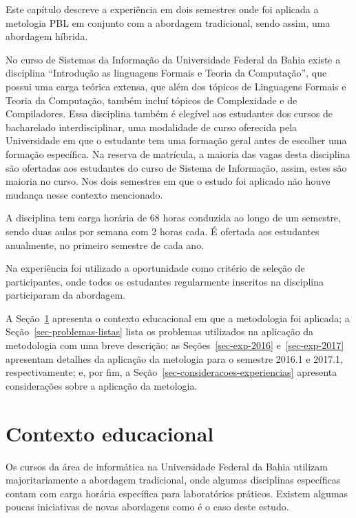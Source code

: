 
\label{cap-experiencia}
\acresetall

Este capítulo descreve a experiência em dois semestres onde foi aplicada a metologia PBL
em conjunto com a abordagem tradicional, sendo assim, uma abordagem híbrida.

No curso de Sistemas da Informação da Universidade Federal da Bahia existe
a disciplina ``Introdução as linguagens Formais e Teoria da Computação'',
que possui uma carga teórica extensa, que além dos tópicos de Linguagens Formais e Teoria
da Computação, também incluí tópicos de Complexidade e de Compiladores.
Essa disciplina também é elegível aos estudantes dos cursos de bacharelado
interdisciplinar, uma modalidade de curso oferecida pela Universidade
em que o estudante tem uma formação geral antes de escolher
uma formação específica.
Na reserva de matrícula, a maioria das vagas desta disciplina são ofertadas aos
estudantes do curso de Sistema de Informação, assim, estes são maioria no curso.
Nos dois semestres em que o estudo foi aplicado não houve mudança nesse
contexto mencionado.

A disciplina tem carga horária de 68 horas conduzida ao longo de um semestre, sendo duas
aulas por semana com 2 horas cada.
É ofertada aos estudantes anualmente, no primeiro semestre de cada ano.

Na experiência foi utilizado a oportunidade como critério de seleção de participantes, onde todos os
estudantes regularmente inscritos na disciplina participaram da abordagem.

A Seção~\ref{sec-contexto-educacional} apresenta o contexto
educacional em que a metodologia foi aplicada;
a Seção~\ref{sec-problemas-listas} lista os problemas utilizados
na aplicação da metodologia com uma breve
descrição;
as Seções~\ref{sec-exp-2016} e~\ref{sec-exp-2017}
apresentam detalhes da aplicação da metologia para o semestre 2016.1 e 2017.1, respectivamente;
e, por fim, a Seção~\ref{sec-consideracoes-experiencias} apresenta
considerações sobre a aplicação da metologia.

\section{Contexto educacional}
\label{sec-contexto-educacional}
Os cursos da área de informática na Universidade Federal da Bahia
utilizam majoritariamente a abordagem tradicional, onde
algumas disciplinas específicas contam com carga horária específica
para laboratórios práticos.
Existem algumas poucas iniciativas de novas abordagens como é
o caso deste estudo.

